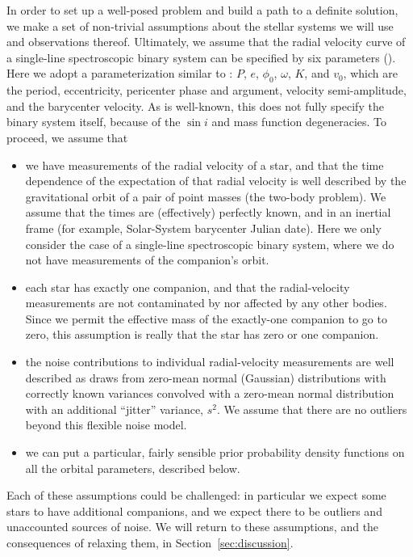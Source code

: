 \documentclass[manuscript, letterpaper]{aastex6}
\newcommand{\sectionname}{Section}
\begin{document}
In order to set up a well-posed problem and build a path to a definite solution,
we make a set of non-trivial assumptions about the stellar systems we will use
and observations thereof.
Ultimately, we assume that the radial velocity curve of a single-line
spectroscopic binary system can be specified by six parameters
(\citealt{Kepler:1609}).
Here we adopt a parameterization similar to \citealt{Murray:2010}:
$P$, $e$, $\phi_0$, $\omega$, $K$, and $v_0$, which are the period,
eccentricity, pericenter phase and argument, velocity semi-amplitude, and the
barycenter velocity.
As is well-known, this does not fully specify the binary system itself, because
of the $\sin{i}$ and mass function degeneracies.
To proceed, we assume that
\begin{itemize}\itemsep0ex  %
\item we have measurements of the radial velocity of a
  star, and that the time dependence of the expectation of that radial
  velocity is well described by the gravitational orbit of a pair of
  point masses (the two-body problem). We assume that the times are
  (effectively) perfectly known, and in an inertial frame (for
  example, Solar-System barycenter Julian date).
  Here we only consider the case of a single-line spectroscopic binary system,
  where we do not have measurements of the companion's orbit.
\item  each star has exactly one companion, and that the
  radial-velocity measurements are not contaminated by nor affected by
  any other bodies. Since we permit the effective mass of the
  exactly-one companion to go to zero, this assumption is really that
  the star has zero or one companion.
\item the noise contributions to individual radial-velocity measurements are
  well described as draws from zero-mean normal (Gaussian) distributions with
  correctly known variances convolved with a zero-mean normal distribution with
  an additional ``jitter'' variance, $s^2$. We assume that there are no outliers
  beyond this flexible noise model.
\item we can put a particular, fairly sensible
  prior probability density functions on all the orbital parameters,
  described below.
\end{itemize}
Each of these assumptions could be challenged: in particular we expect some stars
to have additional companions, and we expect there to be outliers and
unaccounted sources of noise.
We will return to these assumptions, and the consequences of relaxing them, in
\sectionname~\ref{sec:discussion}.
\end{document}

